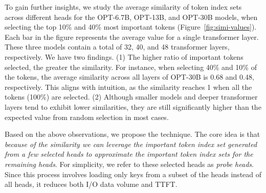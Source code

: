To gain further insights, we study the average similarity of token index sets across different heads for the OPT-6.7B, OPT-13B, and OPT-30B models,
when selecting the top 10\% and 40\%  most important tokens (Figure~\ref{fig:simi-values}). 
Each bar in the figure represents the average value for a single transformer
layer. These three models contain a total of 32, 40, and 48 transformer layers,
respectively. We have two findings.
(1) The higher ratio of important tokens selected, the greater the similarity. For instance, when selecting 40\% and 10\% of the tokens, the average similarity across all layers of OPT-30B is 0.68 and 0.48, respectively. This aligns with intuition, as the similarity reaches 1 when all the tokens (100\%) are selected. 
(2) Although smaller models and deeper transformer layers tend to exhibit lower similarities, they are still significantly higher than the expected value from random selection in most cases. 




Based on the above observations, we propose the \techa{} technique. The core idea is that \textit{because of the similarity we can leverage the important token index set generated from a few selected heads to approximate the important token index sets for the remaining heads}. For simplicity, we refer to these selected heads as \textit{probe heads}. Since this process involves loading only keys from a subset of the heads instead of all heads, it reduces both I/O data volume and TTFT.

